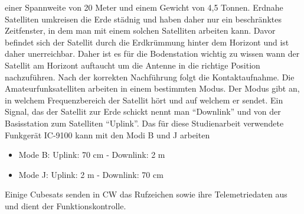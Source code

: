 einer Spannweite von 20 Meter und einem Gewicht von 4,5 Tonnen. Erdnahe Satelliten umkreisen die Erde städnig und haben daher nur ein beschränktes 
Zeitfenster, in dem man mit einem solchen Satelliten arbeiten kann. Davor befindet sich der Satellit durch die Erdkrümmung hinter dem Horizont und 
ist daher unerreichbar. Daher ist es für die Bodenstation wichtig zu wissen wann der Satellit am Horizont auftaucht um die Antenne in die richtige 
Position nachzuführen. Nach der korrekten Nachführung folgt die Kontaktaufnahme. Die Amateurfunksatelliten arbeiten in einem bestimmten Modus. 
Der Modus gibt an, in welchem Frequenzbereich der Satellit hört und auf welchem er sendet. Ein Signal,
das der Satellit zur Erde schickt nennt man ``Downlink'' und von der Basisstation zum Satelliten ``Uplink''. Das für diese Studienarbeit 
verwendete Funkgerät IC-9100 kann mit den Modi B und J arbeiten \cite[S.153]{radiomanual}
\begin{itemize}
 \item Mode B: Uplink: 70 cm - Downlink:  2  m 
 \item Mode J: Uplink:  2  m - Downlink: 70 cm
\end{itemize}
Einige Cubesats senden in \ac{CW} das Rufzeichen sowie ihre Telemetriedaten aus und dient der Funktionskontrolle.
\newpar
